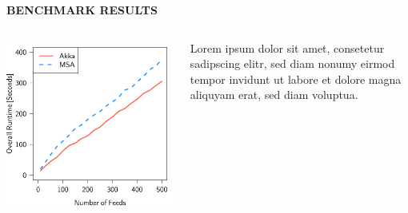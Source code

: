 \documentclass[final,hyperref={pdfpagelabels=true}]{beamer}
\begin{document}
\begin{frame}
  \begin{columns}[t]
    \begin{column}{.45\textwidth}
      \textsf{\textbf{BENCHMARK RESULTS}} \\
      \vspace*{\baselineskip}
      \begin{columns}[t]
        \begin{column}{.45\textwidth}
          \includegraphics[width=1\textwidth]{graphics/eval-index-overall.pdf}
        \end{column}
        \begin{column}{.45\textwidth}
          {\lmodern
            Lorem ipsum dolor sit amet, consetetur sadipscing elitr, sed diam nonumy eirmod tempor invidunt ut labore et dolore magna aliquyam erat, sed diam voluptua.
          }
        \end{column}
      \end{columns}
    \end{column}


\end{columns}
\end{frame}
\end{document}
